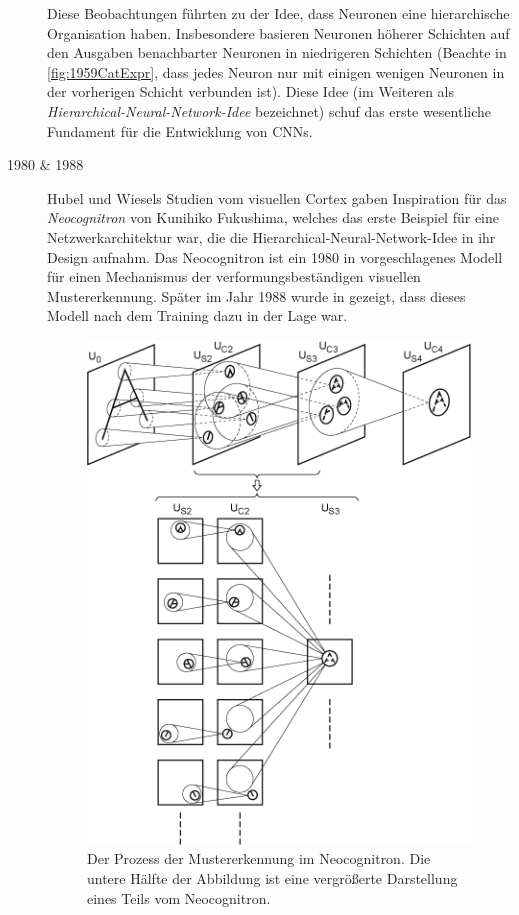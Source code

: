 \begin{description}
	Diese Beobachtungen führten zu der Idee, dass Neuronen eine hierarchische Organisation haben. Insbesondere basieren Neuronen höherer Schichten auf den Ausgaben benachbarter Neuronen in niedrigeren Schichten (Beachte in \autoref{fig:1959CatExpr}, dass jedes Neuron nur mit einigen wenigen Neuronen in der vorherigen Schicht verbunden ist). Diese Idee (im Weiteren als \emph{Hierarchical-Neural-Network-Idee} bezeichnet) schuf das erste wesentliche Fundament für die Entwicklung von CNNs.
		
	\item[1980 \& 1988] 
	
	Hubel und Wiesels Studien vom visuellen Cortex gaben Inspiration für das \emph{Neocognitron} von Kunihiko Fukushima, welches das erste Beispiel für eine Netzwerkarchitektur war, die die Hierarchical-Neural-Network-Idee in ihr Design aufnahm. Das Neocognitron ist ein 1980 in \cite{Neocognitron1980} vorgeschlagenes Modell für einen Mechanismus der verformungsbeständigen visuellen Mustererkennung. Später im Jahr 1988 wurde in \cite{Neocognitron1988} gezeigt, dass dieses Modell nach dem Training dazu in der Lage war.
	
	\begin{figure}[!ht]
		\centering
		\includegraphics[width=0.72\linewidth]{images/Neocognitron}
		\caption{Der Prozess der Mustererkennung im Neocognitron. Die untere Hälfte der Abbildung ist eine vergrößerte Darstellung eines Teils vom Neocognitron. \protect\cite{neocognitron:scholarpediafig2}}
		\label{fig:neocognitron}
	\end{figure}


\end{description}
